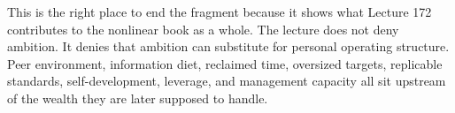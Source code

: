 \documentclass[11pt,oneside]{book}
\begin{document}
This is the right place to end the fragment because it shows what Lecture 172 contributes to the nonlinear book as a whole. The lecture does not deny ambition. It denies that ambition can substitute for personal operating structure. Peer environment, information diet, reclaimed time, oversized targets, replicable standards, self-development, leverage, and management capacity all sit upstream of the wealth they are later supposed to handle.
\end{document}
